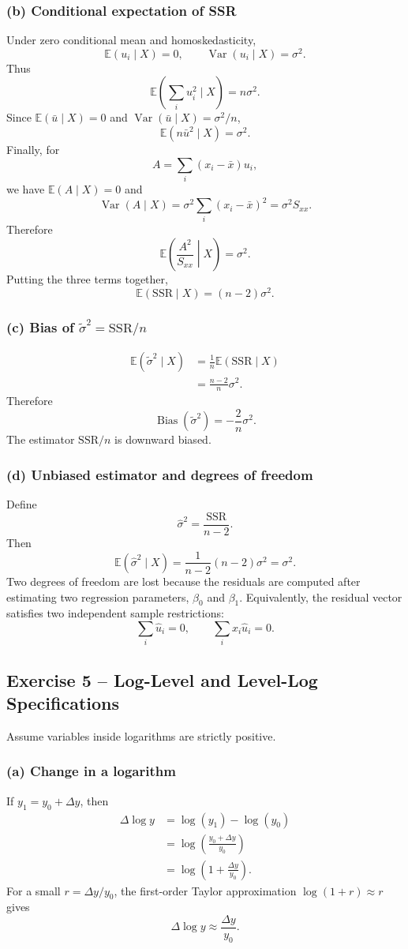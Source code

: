 \documentclass[11pt,a4paper]{article}
\newcommand{\E}{\mathbb{E}}
\newcommand{\Var}{\operatorname{Var}}
\newcommand{\SSR}{\mathrm{SSR}}
\newcommand{\Sxx}{S_{xx}}
\begin{document}
\subsubsection*{(b) Conditional expectation of SSR}
Under zero conditional mean and homoskedasticity,
\[
 \E(u_i\mid X)=0,
 \qquad
 \Var(u_i\mid X)=\sigma^2.
\]
Thus
\[
 \E\!\left(\sum_i u_i^2\mid X\right)=n\sigma^2.
\]
Since $\E(\bar u\mid X)=0$ and $\Var(\bar u\mid X)=\sigma^2/n$,
\[
 \E(n\bar u^2\mid X)=\sigma^2.
\]
Finally, for
\[
 A=\sum_i(x_i-\bar x)u_i,
\]
we have $\E(A\mid X)=0$ and
\[
 \Var(A\mid X)
 =\sigma^2\sum_i(x_i-\bar x)^2
 =\sigma^2\Sxx.
\]
Therefore
\[
 \E\!\left(\frac{A^2}{\Sxx}\middle|X\right)=\sigma^2.
\]
Putting the three terms together,
\[
 \boxed{\E(\SSR\mid X)=(n-2)\sigma^2}.
\]

\subsubsection*{(c) Bias of $\tilde\sigma^2=\SSR/n$}
\begin{align*}
 \E(\tilde\sigma^2\mid X)
 &=\frac{1}{n}\E(\SSR\mid X)\\
 &=\frac{n-2}{n}\sigma^2.
\end{align*}
Therefore
\[
 \boxed{\operatorname{Bias}(\tilde\sigma^2)
 =-\frac{2}{n}\sigma^2}.
\]
The estimator $\SSR/n$ is downward biased.

\subsubsection*{(d) Unbiased estimator and degrees of freedom}
Define
\[
 \hat\sigma^2=\frac{\SSR}{n-2}.
\]
Then
\[
 \E(\hat\sigma^2\mid X)
 =\frac{1}{n-2}(n-2)\sigma^2
 =\boxed{\sigma^2}.
\]
Two degrees of freedom are lost because the residuals are computed after estimating two regression parameters, $\beta_0$ and $\beta_1$. Equivalently, the residual vector satisfies two independent sample restrictions:
\[
 \sum_i\hat u_i=0,
 \qquad
 \sum_i x_i\hat u_i=0.
\]

\subsection{Exercise 5 -- Log-Level and Level-Log Specifications}
Assume variables inside logarithms are strictly positive.

\subsubsection*{(a) Change in a logarithm}
If $y_1=y_0+\Delta y$, then
\begin{align*}
 \Delta\log y
 &=\log(y_1)-\log(y_0)\\
 &=\log\!\left(\frac{y_0+\Delta y}{y_0}\right)\\
 &=\boxed{\log\!\left(1+\frac{\Delta y}{y_0}\right)}.
\end{align*}
For a small $r=\Delta y/y_0$, the first-order Taylor approximation $\log(1+r)\approx r$ gives
\[
 \boxed{\Delta\log y\approx\frac{\Delta y}{y_0}}.
\]
\end{document}
